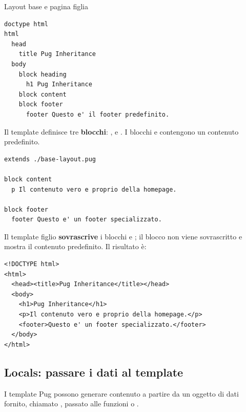 \begin{esempio}{Layout base e pagina figlia}
\begin{lstlisting}[style=pug, name=base-layout.pug]
doctype html
html
  head
    title Pug Inheritance
  body
    block heading
      h1 Pug Inheritance
    block content
    block footer
      footer Questo e' il footer predefinito.
\end{lstlisting}

Il template definisce tre \textbf{blocchi}: ,  e
. I blocchi  e  contengono un contenuto
predefinito.

\begin{lstlisting}[style=pug, name=index.pug]
extends ./base-layout.pug

block content
  p Il contenuto vero e proprio della homepage.

block footer
  footer Questo e' un footer specializzato.
\end{lstlisting}

Il template figlio \textbf{sovrascrive} i blocchi  e
; il blocco  non viene sovrascritto e mostra il
contenuto predefinito. Il risultato è:

\begin{lstlisting}[style=html, name=output.html]
<!DOCTYPE html>
<html>
  <head><title>Pug Inheritance</title></head>
  <body>
    <h1>Pug Inheritance</h1>
    <p>Il contenuto vero e proprio della homepage.</p>
    <footer>Questo e' un footer specializzato.</footer>
  </body>
</html>
\end{lstlisting}
\end{esempio}

\subsection{Locals: passare i dati al template}

I template Pug possono generare contenuto a partire da un oggetto di dati
fornito, chiamato , passato alle funzioni  o
.

